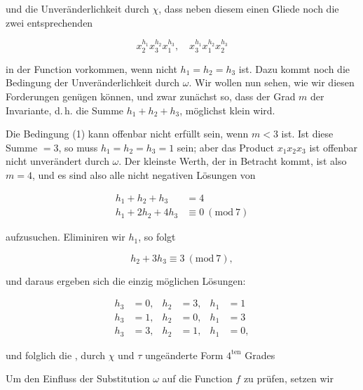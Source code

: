
und die Unveränderlichkeit durch $\chi$, dass neben diesem einen Gliede noch die zwei entsprechenden

\[
x_2^{h_1} x_3^{h_2} x_1^{h_3}, \quad x_3^{h_1} x_1^{h_2} x_2^{h_3}
\]

in der Function vorkommen, wenn nicht $h_1 = h_2 = h_3$ ist. Dazu kommt noch die Bedingung der Unveränderlichkeit durch $\omega$. Wir wollen nun sehen, wie wir diesen Forderungen genügen können, und zwar zunächst so, dass der Grad $m$ der Invariante, d.\,h. die Summe $h_1 + h_2 + h_3$, möglichst klein wird.

Die Bedingung (1) kann offenbar nicht erfüllt sein, wenn $m < 3$ ist. Ist diese Summe $= 3$, so muss $h_1 = h_2 = h_3 = 1$ sein; aber das Product $x_1 x_2 x_3$ ist offenbar nicht unverändert durch $\omega$. Der kleinste Werth, der in Betracht kommt, ist also $m = 4$, und es sind also alle nicht negativen Lösungen von

\[
\begin{aligned}
h_1 + h_2 + h_3 &= 4 \\
h_1 + 2h_2 + 4h_3 &\equiv 0\ (\mathrm{mod}\ 7)
\end{aligned}
\]

aufzusuchen. Eliminiren wir $h_1$, so folgt

\[
h_2 + 3h_3 \equiv 3\ (\mathrm{mod}\ 7),
\]

und daraus ergeben sich die einzig möglichen Lösungen:

\[
\begin{aligned}
h_3 &= 0, & h_2 &= 3, & h_1 &= 1 \\
h_3 &= 1, & h_2 &= 0, & h_1 &= 3 \\
h_3 &= 3, & h_2 &= 1, & h_1 &= 0,
\end{aligned}
\]

und folglich die , durch $\chi$ und $\tau$ ungeänderte Form $4^{\mathrm{ten}}$ Grades


Um den Einfluss der Substitution $\omega$ auf die Function $f$ zu prüfen, setzen wir


